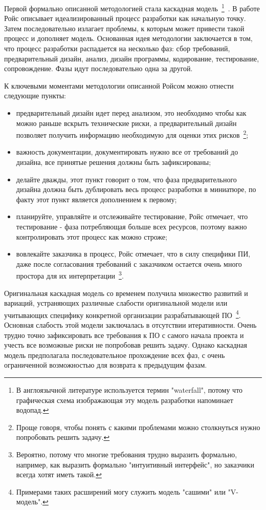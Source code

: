 Первой формально описанной методологией стала каскадная модель~\footnote{В англоязычной литературе используется термин "waterfall", потому что графическая схема изображающая эту модель разработки напоминает водопад.}~\cite{Royce:1970:MDL}. В работе Ройс описывает идеализированный процесс разработки как начальную точку. Затем последовательно излагает проблемы, к которым может привести такой процесс и дополняет модель. Основанная идея методологии заключается в том, что процесс разработки распадается на несколько фаз: сбор требований, предварительный дизайн, анализ, дизайн программы, кодирование, тестирование, сопровождение. Фазы идут последовательно одна за другой.

К ключевыми моментами методологии описанной Ройсом можно отнести следующие пункты:
\begin{itemize}
  \item предварительный дизайн идет перед анализом, это необходимо чтобы как можно раньше вскрыть технические риски, а предварительный дизайн позволяет получить информацию необходимую для оценки этих рисков~\footnote{Проще говоря, чтобы понять с какими проблемами можно столкнуться нужно попробовать решить задачу.};
  \item важность документации, документировать нужно все от требований до дизайна, все принятые решения должны быть зафиксированы;
  \item делайте дважды, этот пункт говорит о том, что фаза предварительного дизайна должна быть дублировать весь процесс разработки в миниатюре, по факту этот пункт является дополнением к первому;
  \item планируйте, управляйте и отслеживайте тестирование, Ройс отмечает, что тестирование - фаза потребляющая больше всех ресурсов, поэтому важно контролировать этот процесс как можно строже;
  \item вовлекайте заказчика в процесс, Ройс отмечает, что в силу специфики ПИ, даже после согласования требований с заказчиком остается очень много простора для их интерпретации~\footnote{Вероятно, потому что многие требования трудно выразить формально, например, как выразить формально "интуитивный интерфейс", но заказчики всегда хотят иметь такой.}.
\end{itemize}

Оригинальная каскадная модель со временем получила множество развитий и вариаций, устраняющих различные слабости оригинальной модели или учитывающих специфику конкретной организации разрабатывающей ПО~\footnote{Примерами таких расширений могу служить модель "сашими" или "V-модель".}. Основная слабость этой модели заключалась в отсутствии итеративности. Очень трудно точно зафиксировать все требования к ПО с самого начала проекта и учесть все возможные риски не попробовав решить задачу. Однако каскадная модель предполагала последовательное прохождение всех фаз, с очень ограниченной возможностью для возврата к предыдущим фазам.

